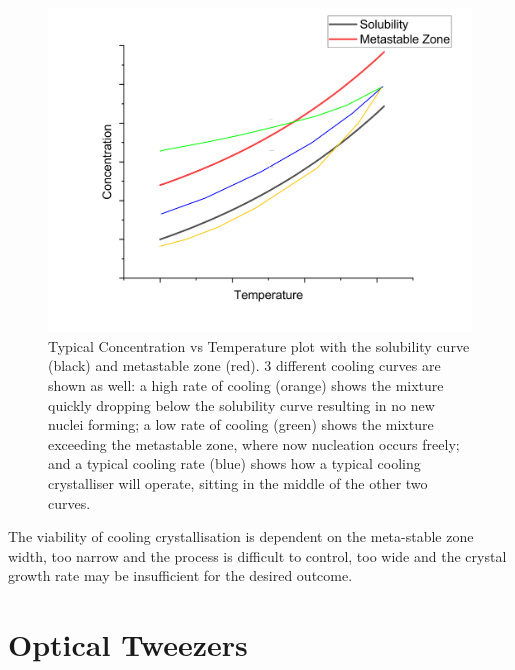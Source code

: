 \begin{figure}[h!]
	\label{fig:MSZW}
	\includegraphics[width=\linewidth]{MSZW.png}
	\caption{Typical Concentration vs Temperature plot with the solubility curve (black) and metastable zone (red). 3 different cooling curves are shown as well: a high rate of cooling (orange) shows the mixture quickly dropping below the solubility curve resulting in no new nuclei forming; a low rate of cooling (green) shows the mixture exceeding the metastable zone, where now nucleation occurs freely; and a typical cooling rate (blue) shows how a typical cooling crystalliser will operate, sitting in the middle of the other two curves.}
\end{figure}

The viability of cooling crystallisation is dependent on the meta-stable 
zone width, too narrow and the process is difficult to control, too wide 
and the crystal growth rate may be insufficient for the desired outcome.

\section{Optical Tweezers}
